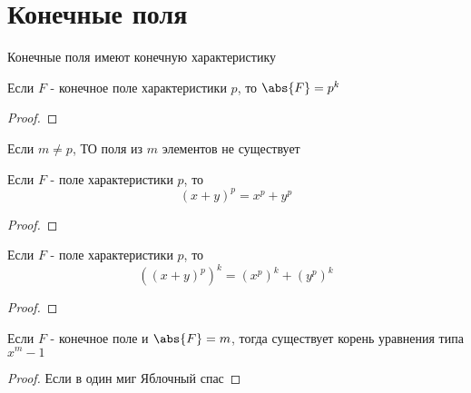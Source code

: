 \documentclass[../main/document.tex]{subfiles}
\begin{document}
\section{Конечные поля}

\begin{dfn}

\end{dfn}

\begin{cnsq}
Конечные поля имеют конечную характеристику
\end{cnsq}

\begin{thm}
Если $F$ - конечное поле характеристики $p$, то $\abs{F}=p^k$
\begin{proof}

\end{proof}
\end{thm}
\begin{cnsq}
Если $m\neq p$, ТО поля из $m$ элементов не существует
\end{cnsq}
\begin{thm}
Если $F$ - поле характеристики $p$, то
$$(x+y)^p=x^p+y^p$$
\begin{proof}

\end{proof}
\end{thm}
\begin{thm}
Если $F$ - поле характеристики $p$, то
$$({(x+y)^p})^k=({x^p})^k+({y^p})^k$$
\begin{proof}

\end{proof}
\end{thm}
\begin{thm}
Если $F$ - конечное поле и $\abs{F}=m$, тогда существует корень уравнения типа $x^m-1$
\begin{proof}
Если в один миг
Яблочный спас
\end{proof}
\end{thm}
\end{document}
